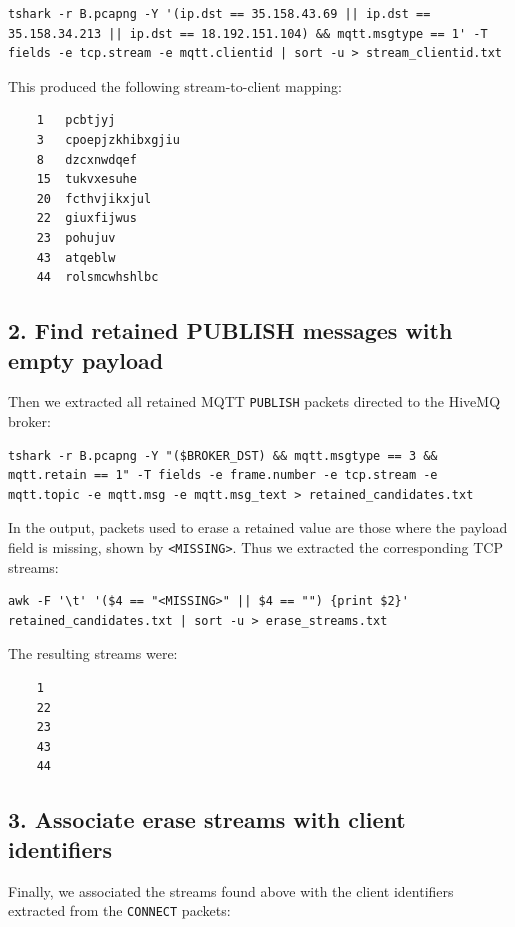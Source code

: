 \begin{lstlisting}
tshark -r B.pcapng -Y '(ip.dst == 35.158.43.69 || ip.dst == 35.158.34.213 || ip.dst == 18.192.151.104) && mqtt.msgtype == 1' -T fields -e tcp.stream -e mqtt.clientid | sort -u > stream_clientid.txt
\end{lstlisting}

This produced the following stream-to-client mapping:

    \begin{verbatim}
    1   pcbtjyj
    3   cpoepjzkhibxgjiu
    8   dzcxnwdqef
    15  tukvxesuhe
    20  fcthvjikxjul
    22  giuxfijwus
    23  pohujuv
    43  atqeblw
    44  rolsmcwhshlbc
    \end{verbatim}


\subsection*{2. Find retained PUBLISH messages with empty payload}

Then we extracted all retained MQTT \texttt{PUBLISH} packets directed to the HiveMQ broker:

\begin{lstlisting}
tshark -r B.pcapng -Y "($BROKER_DST) && mqtt.msgtype == 3 && mqtt.retain == 1" -T fields -e frame.number -e tcp.stream -e mqtt.topic -e mqtt.msg -e mqtt.msg_text > retained_candidates.txt
\end{lstlisting}

In the output, packets used to erase a retained value are those where the payload field is missing, shown by \texttt{<MISSING>}.  
Thus we extracted the corresponding TCP streams:

\begin{lstlisting}
awk -F '\t' '($4 == "<MISSING>" || $4 == "") {print $2}' retained_candidates.txt | sort -u > erase_streams.txt
\end{lstlisting}
The resulting streams were:
    \begin{verbatim}
    1
    22
    23
    43
    44
    \end{verbatim}

\subsection*{3. Associate erase streams with client identifiers}

Finally, we associated the streams found above with the client identifiers extracted from the \texttt{CONNECT} packets:

